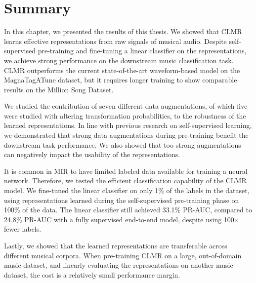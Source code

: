 \section*{Summary}
In this chapter, we presented the results of this thesis. We showed that CLMR learns effective representations from raw signals of musical audio. Despite self-supervised pre-training and fine-tuning a linear classifier on the representations, we achieve strong performance on the downstream music classification task. CLMR outperforms the current state-of-the-art waveform-based model on the MagnaTagATune dataset, but it requires longer training to show comparable results on the Million Song Dataset.

We studied the contribution of seven different data augmentations, of which five were studied with altering transformation probabilities, to the robustness of the learned representations. In line with previous research on self-supervised learning, we demonstrated that strong data augmentations during pre-training benefit the downstream task performance. We also showed that too strong augmentations can negatively impact the usability of the representations.

It is common in MIR to have limited labeled data available for training a neural network. Therefore, we tested the efficient classification capability of the CLMR model. We fine-tuned the linear classifier on only 1\% of the labels in the dataset, using representations learned during the self-supervised pre-training phase on 100\% of the data. The linear classifier still achieved 33.1\% PR-AUC, compared to 24.8\% PR-AUC with a fully supervised end-to-end model, despite using 100$\times$ fewer labels.

Lastly, we showed that the learned representations are transferable across different musical corpora. When pre-training CLMR on a large, out-of-domain music dataset, and linearly evaluating the representations on another music dataset, the cost is a relatively small performance margin.
